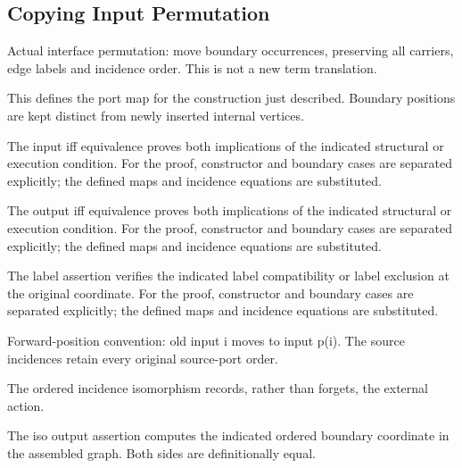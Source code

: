 \subsection{Copying Input Permutation}
Actual interface permutation: move boundary occurrences, preserving all carriers, edge labels and incidence order. This is not a new term translation.

This defines the port map for the construction just described. Boundary positions are kept distinct from newly inserted internal vertices.
\par{}

The input iff equivalence proves both implications of the indicated structural or execution condition.
For the proof, constructor and boundary cases are separated explicitly; the defined maps and incidence equations are substituted.
\par{}

The output iff equivalence proves both implications of the indicated structural or execution condition.
For the proof, constructor and boundary cases are separated explicitly; the defined maps and incidence equations are substituted.
\par{}

The label assertion verifies the indicated label compatibility or label exclusion at the original coordinate.
For the proof, constructor and boundary cases are separated explicitly; the defined maps and incidence equations are substituted.
\par{}

Forward-position convention: old input i moves to input p(i). The source incidences retain every original source-port order.
\par{}

The ordered incidence isomorphism records, rather than forgets, the external action.
\par{}

The iso output assertion computes the indicated ordered boundary coordinate in the assembled graph.
Both sides are definitionally equal.
\par{}

